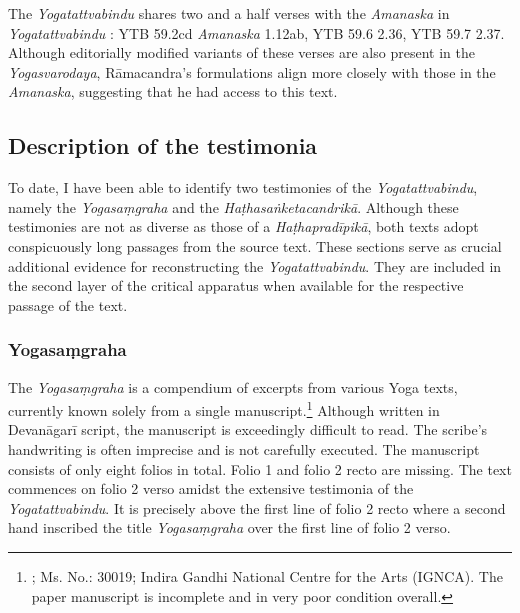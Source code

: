 The \emph{Yogatattvabindu} shares two and a half verses with the \emph{Amanaska} in \emph{Yogatattvabindu} : YTB 59.2cd \approx \emph{Amanaska} 1.12ab, YTB 59.6 \approx {} 2.36, YTB 59.7 \approx {} 2.37. Although editorially modified variants of these verses are also present in the \emph{Yogasvarodaya}, Rāmacandra's formulations align more closely with those in the \emph{Amanaska}, suggesting that he had access to this text.

\subsection{Description of the testimonia}

To date, I have been able to identify two testimonies of the \emph{Yogatattvabindu}, namely the \emph{Yogasaṃgraha} and the \emph{Haṭhasaṅketacandrikā}. Although these testimonies are not as diverse as those of a \emph{Haṭhapradīpikā}, both texts adopt conspicuously long passages from the source text. These sections serve as crucial additional evidence for reconstructing the \emph{Yogatattvabindu}. They are included in the second layer of the critical apparatus when available for the respective passage of the text.

\subsubsection{Yogasaṃgraha}
\label{yogasamgraha}

The \emph{Yogasaṃgraha} is a compendium of excerpts from various Yoga texts, currently known solely from a single manuscript.\footnote{; Ms. No.: 30019; Indira Gandhi National Centre for the Arts (IGNCA). The paper manuscript is incomplete and in very poor condition overall.} Although written in Devanāgarī script, the manuscript is exceedingly difficult to read. The scribe's handwriting is often imprecise and is not carefully executed. The manuscript consists of only eight folios in total. Folio 1 and folio 2 recto are missing. The text commences on folio 2 verso amidst the extensive testimonia of the \emph{Yogatattvabindu}. It is precisely above the first line of folio 2 recto where a second hand inscribed the title \emph{Yogasaṃgraha} over the first line of folio 2 verso.

